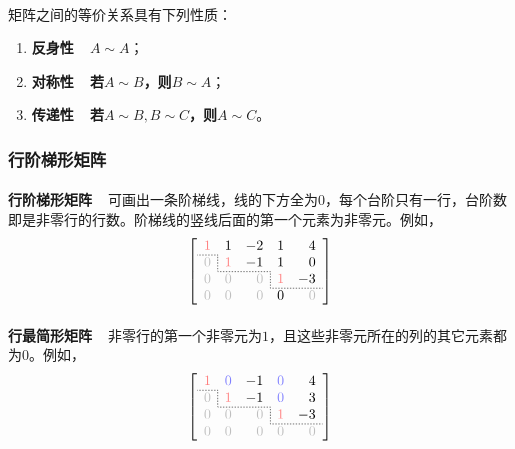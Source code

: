 \paragraph{}
矩阵之间的等价关系具有下列性质：
\begin{enumerate}
  \item \textbf{反身性~~$A\sim A$}；
  \item \textbf{对称性~~若$A\sim B$，则$B\sim A$}；
  \item \textbf{传递性~~若$A\sim B, B\sim C$，则$A\sim C$}。
\end{enumerate}

\subsubsection{行阶梯形矩阵}
\paragraph{}
\textbf{行阶梯形矩阵~~}可画出一条阶梯线，线的下方全为$0$，每个台阶只有一行，台阶数即是非零行的行数。阶梯线的竖线后面的第一个元素为非零元。例如，
\begin{equation*}
\left[\begin{array}{rrrrr}
  {\color{red!50}1} & 1 & -2 & 1 & 4 \\\cdashline{1-1}[1pt/1pt]
  \multicolumn{1}{r;{1pt/1pt}}{{\color{gray!50}0}} & {\color{red!50}1} & -1 & 1 & 0 \\\cdashline{2-3}[1pt/1pt]
  {\color{gray!50}0} & {\color{gray!50}0} & \multicolumn{1}{r;{1pt/1pt}}{{\color{gray!50}0}} & {\color{red!50}1} & -3 \\\cdashline{4-5}[1pt/1pt]
  {\color{gray!50}0} & {\color{gray!50}0} & {\color{gray!50}0} & 0 & {\color{gray!50}0}
\end{array}\right]
\end{equation*}

\paragraph{}
\textbf{行最简形矩阵~~}非零行的第一个非零元为$1$，且这些非零元所在的列的其它元素都为$0$。例如，
\begin{equation*}
  \left[\begin{array}{rrrrr}
    {\color{red!50}1} & {\color{blue!50}0} & -1 & {\color{blue!50}0} & 4 \\\cdashline{1-1}[1pt/1pt]
    \multicolumn{1}{r;{1pt/1pt}}{{\color{gray!50}0}} & {\color{red!50}1} & -1 & {\color{blue!50}0} & 3 \\\cdashline{2-3}[1pt/1pt]
    {\color{gray!50}0} & {\color{gray!50}0} & \multicolumn{1}{r;{1pt/1pt}}{{\color{gray!50}0}} & {\color{red!50}1} & -3 \\\cdashline{4-5}[1pt/1pt]
    {\color{gray!50}0} & {\color{gray!50}0} & {\color{gray!50}0} & {\color{gray!50}0} & {\color{gray!50}0}
  \end{array}\right]
\end{equation*}


